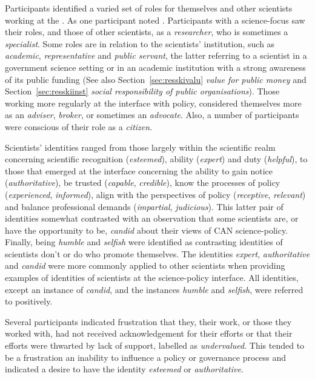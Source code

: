 Participants identified a varied set of roles for themselves and other scientists working at the \SPI. As one participant noted . Participants with a science-focus saw their roles, and those of other scientists, as a \emph{researcher}, who is sometimes a \emph{specialist}. Some roles are in relation to the scientists' institution, such as \emph{academic}, \emph{representative} and \emph{public servant}, the latter referring to a scientist in a government science setting or in an academic institution with a strong awareness of its public funding (See also Section~\ref{sec:resskivalu} \emph{value for public money} and Section~\ref{sec:resskiinst} \emph{social responsibility of public organisations}). Those working more regularly at the interface with policy, considered themselves more as an \emph{adviser}, \emph{broker}, or sometimes an \emph{advocate}. Also, a number of participants were conscious of their role as a \emph{citizen}.

Scientists' identities ranged from those largely within the scientific realm concerning scientific recognition (\emph{esteemed}), ability (\emph{expert}) and duty (\emph{helpful}), to those that emerged at the interface concerning the ability to gain notice (\emph{authoritative}), be trusted (\emph{capable}, \emph{credible}), know the processes of policy (\emph{experienced}, \emph{informed}), align with the perspectives of policy (\emph{receptive}, \emph{relevant}) and balance professional demands (\emph{impartial}, \emph{judicious}). This latter pair of identities somewhat contrasted with an observation that some scientists are, or have the opportunity to be, \emph{candid} about their views of CAN science-policy. Finally, being \emph{humble} and \emph{selfish} were identified as contrasting identities of scientists don't or do who promote themselves. The identities \emph{expert}, \emph{authoritative} and \emph{candid} were more commonly applied to other scientists when providing examples of identities of scientists at the science-policy interface. All identities, except an instance of \emph{candid}, and the instances \emph{humble} and \emph{selfish}, were referred to positively.

Several participants indicated frustration that they, their work, or those they worked with, had not received acknowledgement for their efforts or that their efforts were thwarted by lack of support, labelled as \emph{undervalued}. This tended to be a frustration an inability to influence a policy or governance process and indicated a desire to have the identity \emph{esteemed} or \emph{authoritative}.

